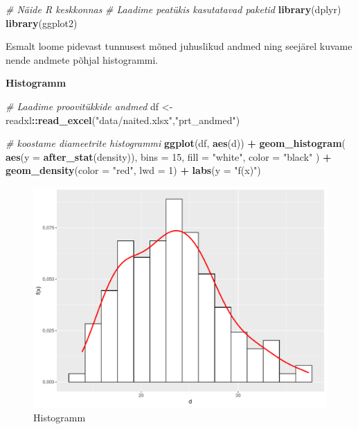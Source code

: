 \documentclass[
]{book}
\newenvironment{Shaded}{\begin{snugshade}}{\end{snugshade}}
\newcommand{\AttributeTok}[1]{\textcolor[rgb]{0.13,0.29,0.53}{#1}}
\newcommand{\CommentTok}[1]{\textcolor[rgb]{0.56,0.35,0.01}{\textit{#1}}}
\newcommand{\DecValTok}[1]{\textcolor[rgb]{0.00,0.00,0.81}{#1}}
\newcommand{\FunctionTok}[1]{\textcolor[rgb]{0.13,0.29,0.53}{\textbf{#1}}}
\newcommand{\NormalTok}[1]{#1}
\newcommand{\OtherTok}[1]{\textcolor[rgb]{0.56,0.35,0.01}{#1}}
\newcommand{\SpecialCharTok}[1]{\textcolor[rgb]{0.81,0.36,0.00}{\textbf{#1}}}
\newcommand{\StringTok}[1]{\textcolor[rgb]{0.31,0.60,0.02}{#1}}
\renewenvironment{Shaded} {\begin{snugshade}\footnotesize} {\end{snugshade}}
\begin{document}
\begin{Shaded}
\begin{Highlighting}[]
\CommentTok{\# Näide R keskkonnas}
\CommentTok{\# Laadime peatükis kasutatavad paketid}
\FunctionTok{library}\NormalTok{(dplyr)}
\FunctionTok{library}\NormalTok{(ggplot2)}
\end{Highlighting}
\end{Shaded}

Esmalt loome pidevast tunnusest mõned juhuslikud andmed ning seejärel kuvame nende andmete põhjal histogrammi.

\textbf{Histogramm}

\begin{Shaded}
\begin{Highlighting}[]
\CommentTok{\# Laadime proovitükkide andmed}
\NormalTok{df }\OtherTok{\textless{}{-}}\NormalTok{ readxl}\SpecialCharTok{::}\FunctionTok{read\_excel}\NormalTok{(}\StringTok{"data/naited.xlsx"}\NormalTok{,}\StringTok{"prt\_andmed"}\NormalTok{)}

\CommentTok{\# koostame diameetrite histogrammi}
\FunctionTok{ggplot}\NormalTok{(df, }\FunctionTok{aes}\NormalTok{(d)) }\SpecialCharTok{+}
  \FunctionTok{geom\_histogram}\NormalTok{(}
    \FunctionTok{aes}\NormalTok{(}\AttributeTok{y =} \FunctionTok{after\_stat}\NormalTok{(density)),}
    \AttributeTok{bins =} \DecValTok{15}\NormalTok{,}
    \AttributeTok{fill =} \StringTok{"white"}\NormalTok{,}
    \AttributeTok{color =} \StringTok{"black"}
\NormalTok{  ) }\SpecialCharTok{+}
  \FunctionTok{geom\_density}\NormalTok{(}\AttributeTok{color =} \StringTok{"red"}\NormalTok{, }\AttributeTok{lwd =} \DecValTok{1}\NormalTok{) }\SpecialCharTok{+}
  \FunctionTok{labs}\NormalTok{(}\AttributeTok{y =} \StringTok{"f(x)"}\NormalTok{)}
\end{Highlighting}
\end{Shaded}

\begin{figure}
\includegraphics[width=0.8\linewidth]{_main_files/figure-latex/unnamed-chunk-23-1} \caption{Histogramm}\label{fig:unnamed-chunk-23}
\end{figure}
\end{document}
